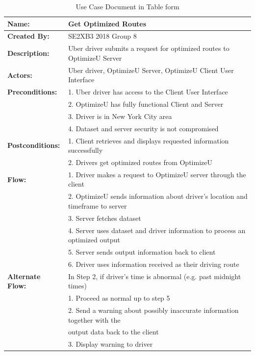 \documentclass[12pt]{article}
\begin{document}
\begin{table}[H]
 \centering
  \begin{adjustbox}{max width=\textwidth}
  \begin{tabular}{*{2}{|l}|}
  \hline
  \textbf{Name:} & Get Optimized Routes\\
  \hline
  \textbf{Created By:} & SE2XB3 2018 Group 8\\
  \hline
  \textbf{Description:} & Uber driver submits a request for optimized routes to OptimizeU Server\\
  \hline
  \textbf{Actors:} & Uber driver, OptimizeU Server, OptimizeU Client User Interface\\
  \hline
  \textbf{Preconditions:} & 1. Uber driver has access to the Client User Interface\\
  						  & 2. OptimizeU has fully functional Client and Server\\
  						  & 3. Driver is in New York City area\\
  						  &	4. Dataset and server security is not compromised\\
  \hline
  \textbf{Postconditions:} & 1. Client retrieves and displays requested information successfully\\
                          & 2. Drivers get optimized routes from OptimizeU\\
  \hline
  \textbf{Flow:} & 1. Driver makes a request to OptimizeU server through the client\\
                 & 2. OptimizeU sends information about driver's location and timeframe to server\\
                 & 3. Server fetches dataset\\
                 & 4. Server uses dataset and driver information to process an optimized output\\
                 & 5. Server sends output information back to client\\
                 & 6. Driver uses information received as their driving route\\
  \hline
  \textbf{Alternate Flow:} & In Step 2, if driver's time is abnormal (e.g. past midnight times)\\
                           & 1. Proceed as normal up to step 5\\
                           & 2. Send a warning about possibly inaccurate information together with the \\
                           &    output data back to the client\\
                           & 3. Display warning to driver\\
  \hline
\end{tabular}
\end{adjustbox}
  \caption{Use Case Document in Table form}
  \label{usecase}
\end{table}
\end{document}
